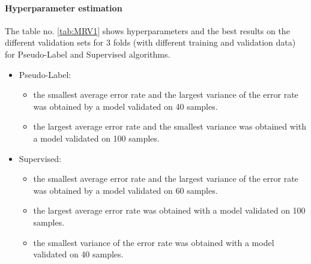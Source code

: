 \documentclass[12pt]{article}
\theoremstyle{definition}
\DeclareRobustCommand{\[}{\begin{equation}}
\DeclareRobustCommand{\]}{\end{equation}}
\begin{document}
\paragraph{Hyperparameter estimation} 
\par The table no. \ref{tab:MRV1} shows hyperparameters and the best results on the different validation sets for 3 folds (with different training and validation data) for Pseudo-Label and Supervised algorithms.
\begin{itemize}
   \item Pseudo-Label:
    \begin{itemize}
        \item the smallest average error rate and the largest variance of the error rate was obtained by a model validated on 40 samples.
        \item the largest average error rate and the smallest variance was obtained with a model validated on 100 samples.
    \end{itemize}
    \item Supervised:
    \begin{itemize}
        \item the smallest average error rate and the largest variance of the error rate was obtained by a model validated on 60 samples.
        \item the largest average error rate was obtained with a model validated on 100 samples.
        \item the smallest variance of the error rate was obtained with a model validated on 40 samples.
    \end{itemize}
\end{itemize}
\end{document}
